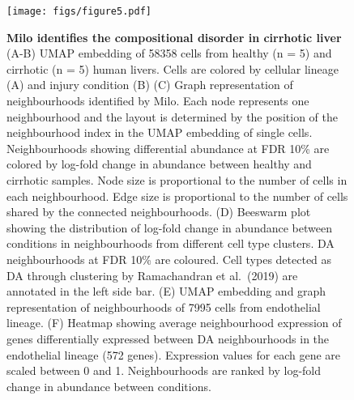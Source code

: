 \documentclass[
  10pt,
]{article}
\begin{document}
\begin{figure}
\centering
\texttt{[image: figs/figure5.pdf]}
\caption{\label{fig:fig-5}\textbf{Milo identifies the compositional disorder in cirrhotic liver}
(A-B) UMAP embedding of 58358 cells from healthy (n = 5) and cirrhotic (n = 5) human livers. Cells are colored by cellular lineage (A) and injury condition (B)
(C) Graph representation of neighbourhoods identified by Milo. Each node represents one neighbourhood and the layout is determined by the position of the neighbourhood index in the UMAP embedding of single cells. Neighbourhoods showing differential abundance at FDR 10\% are colored by log-fold change in abundance between healthy and cirrhotic samples. Node size is proportional to the number of cells in each neighbourhood. Edge size is proportional to the number of cells shared by the connected neighbourhoods.
(D) Beeswarm plot showing the distribution of log-fold change in abundance between conditions in neighbourhoods from different cell type clusters. DA neighbourhoods at FDR 10\% are coloured. Cell types detected as DA through clustering by Ramachandran et al.~(2019) are annotated in the left side bar.
(E) UMAP embedding and graph representation of neighbourhoods of 7995 cells from endothelial lineage.
(F) Heatmap showing average neighbourhood expression of genes differentially expressed between DA neighbourhoods in the endothelial lineage (572 genes). Expression values for each gene are scaled between 0 and 1. Neighbourhoods are ranked by log-fold change in abundance between conditions.}
\end{figure}
\end{document}
